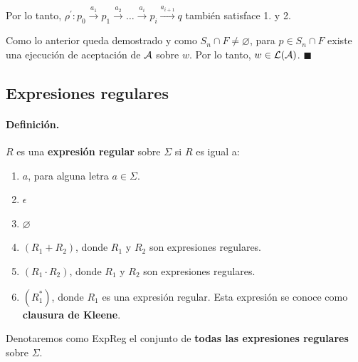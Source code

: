 Por lo tanto, $\rho^{\prime}: p_0 \stackrel{a_1}{\rightarrow} p_1 \stackrel{a_2}{\rightarrow} \ldots \stackrel{a_i}{\rightarrow} p_i \stackrel{a_{i+1}}{\rightarrow} q$ también satisface 1. y 2. \medbreak

Como lo anterior queda demostrado y como $S_n \cap F \neq \varnothing$, para $p \in S_n \cap F$ existe una ejecución de aceptación de $\mathcal{A}$ sobre $w$. Por lo tanto, $w \in \mathcal{L}(\mathcal{A})$. \hfill $\blacksquare$

\subsection{Expresiones regulares}

\paragraph{Definición.} $R$ es una \textbf{expresión regular} sobre $\Sigma$ si $R$ es igual a:
\begin{enumerate}
    \item $a$, para alguna letra $a \in \Sigma$.
    \item $\epsilon$
    \item $\varnothing$
    \item $(R_1 + R_2)$, donde $R_1$ y $R_2$ son expresiones regulares.
    \item $(R_1 \cdot R_2)$, donde $R_1$ y $R_2$ son expresiones regulares.
    \item $(R_1^*)$, donde $R_1$ es una expresión regular. Esta expresión se conoce como \textbf{clausura de Kleene}.
\end{enumerate}

Denotaremos como ExpReg el conjunto de \textbf{todas las expresiones regulares} sobre $\Sigma$.


